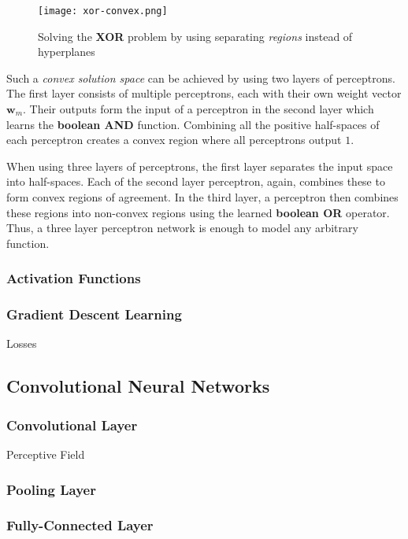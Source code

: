 \begin{figure}[htb!]
    \centering
    \texttt{[image: xor-convex.png]}
    \caption{Solving the \textbf{XOR} problem by using separating \textit{regions} instead of hyperplanes \cite{rojas_neural_1996}}
    \label{fig:xor-convex}
\end{figure}

Such a \textit{convex solution space} can be achieved by using two layers of perceptrons.
The first layer consists of multiple perceptrons, each with their own weight vector $\bm{w}_m$.
Their outputs form the input of a perceptron in the second layer which learns the \textbf{boolean AND} function.
Combining all the positive half-spaces of each perceptron creates a convex region where all perceptrons output $1$.

When using three layers of perceptrons, the first layer separates the input space into half-spaces.
Each of the second layer perceptron, again, combines these to form convex regions of agreement.
In the third layer, a perceptron then combines these regions into non-convex regions using the learned \textbf{boolean OR} operator.
Thus, a three layer perceptron network is enough to model any arbitrary function.

\subsubsection{Activation Functions}

\subsubsection{Gradient Descent Learning}
Losses

\subsection{Convolutional Neural Networks}
\subsubsection{Convolutional Layer}
Perceptive Field


\subsubsection{Pooling Layer}

\subsubsection{Fully-Connected Layer}